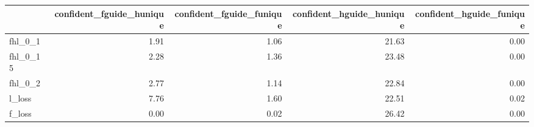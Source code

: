 \begin{tabular}{lrrrr}
\toprule
 & confident_fguide_hunique & confident_fguide_funique & confident_hguide_hunique & confident_hguide_funique \\
\midrule
fhl_0_1 & 1.91 & 1.06 & 21.63 & 0.00 \\
fhl_0_15 & 2.28 & 1.36 & 23.48 & 0.00 \\
fhl_0_2 & 2.77 & 1.14 & 22.84 & 0.00 \\
l_loss & 7.76 & 1.60 & 22.51 & 0.02 \\
f_loss & 0.00 & 0.02 & 26.42 & 0.00 \\
\bottomrule
\end{tabular}
